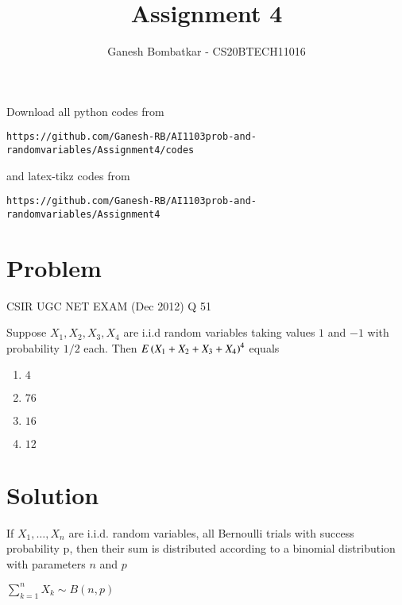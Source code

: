 \documentclass[journal,12pt,twocolumn]{IEEEtran}
\begin{document}
     \def\rightbox#1{\makebox[0in][r]{#1}}
     \def\centbox#1{\makebox[0in]{#1}}
     \def\topbox#1{\raisebox{-\baselineskip}[0in][0in]{#1}}
     \def\midbox#1{\raisebox{-0.5\baselineskip}[0in][0in]{#1}}
\vspace{3cm}
\title{Assignment 4}
\author{Ganesh Bombatkar - CS20BTECH11016}
\maketitle
\newpage
\bigskip
\renewcommand{\thefigure}{\theenumi}
\renewcommand{\thetable}{\theenumi}
Download all python codes from 
\begin{lstlisting}
https://github.com/Ganesh-RB/AI1103prob-and-randomvariables/Assignment4/codes
\end{lstlisting}
%
and latex-tikz codes from 
%
\begin{lstlisting}
https://github.com/Ganesh-RB/AI1103prob-and-randomvariables/Assignment4
\end{lstlisting}

\section{Problem}
{
\centering CSIR UGC NET EXAM (Dec 2012) Q 51

}
Suppose $X_1,X_2,X_3,X_4$ are i.i.d random variables taking values $1$ and $-1$ with probability $1/2$ each. Then $E\left(X_1+X_2 +X_3 +X_4\right)^4$ equals
\begin{multicols}{4}
\begin{enumerate}
    \item $4$
    \item $76$
    \item $16$
    \item $12$
\end{enumerate}
\end{multicols}


\section{Solution}
\begin{theorem}
If ${ X_{1},\dots ,X_{n}}$ are i.i.d. random variables, all Bernoulli trials with success probability p, then their sum is distributed according to a binomial distribution with parameters $n$ and $p$

{\centering
${\displaystyle \sum _{k=1}^{n}X_{k}\sim  {B} (n,p)}$

}
\label{binom_theorem}
\end{theorem}
\end{document}

